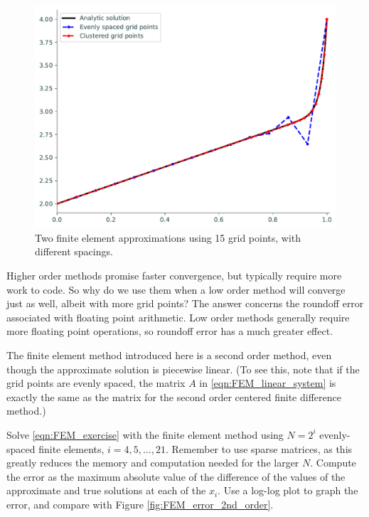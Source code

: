 \begin{figure}[ht]
\centering
\includegraphics[width=\textwidth]{figures/FEM_compare_methods.pdf}
\caption{Two finite element approximations using 15 grid points, with different spacings. }
\label{fig:FEM_compare_methods}
\end{figure}

\begin{problem}
\label{prob:FEM_accuracy_comparison}
Higher order methods promise faster convergence, but typically require more work to code.
So why do we use them when a low order method will converge just as well, albeit with more grid points?
The answer concerns the roundoff error associated with floating point arithmetic.
Low order methods generally require more floating point operations, so roundoff error has a much greater effect.

The finite element method introduced here is a second order method, even though the approximate solution is piecewise linear.
(To see this, note that if the grid points are evenly spaced, the matrix $A$ in \eqref{eqn:FEM_linear_system} is exactly the same as the matrix for the second order centered finite difference method.)

Solve \eqref{eqn:FEM_exercise} with the finite element method using $N = 2^i$ evenly-spaced finite elements, $i = 4, 5, \ldots, 21$.
Remember to use sparse matrices, as this greatly reduces the memory and computation needed for the larger \(N\).
Compute the error as the maximum absolute value of the difference of the values of the approximate and true solutions at each of the \(x_i\).
Use a log-log plot to graph the error, and compare with Figure \ref{fig:FEM_error_2nd_order}.
\end{problem}


